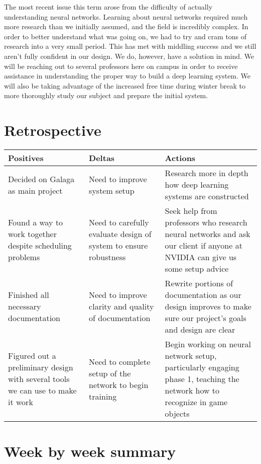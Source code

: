 \documentclass[onecolumn, draftclsnofoot,10pt, compsoc]{IEEEtran}
\begin{document}
\newline\newline
The most recent issue this term arose from the difficulty of actually understanding neural networks.
Learning about neural networks required much more research than we initially assumed, and the field is incredibly complex.
In order to better understand what was going on, we had to try and cram tons of research into a very small period.
This has met with middling success and we still aren't fully confident in our design.
We do, however, have a solution in mind.
We will be reaching out to several professors here on campus in order to receive assistance in understanding the proper way to build a deep learning system.
We will also be taking advantage of the increased free time during winter break to more thoroughly study our subject and prepare the initial system.

\section{Retrospective}

\begin{center}
\begin{tabu} to 0.9\linewidth{ || X[l] | X[l] | X[l] || }
	\hline
	Positives & Deltas & Actions \\
	\hline\hline
	Decided on Galaga as main project & Need to improve system setup & Research more in depth how deep learning systems are constructed \\ \hline
	Found a way to work together despite scheduling problems & Need to carefully evaluate design of system to ensure robustness & Seek help from professors who research neural networks and ask our client if anyone at NVIDIA can give us some setup advice \\ \hline
	Finished all necessary documentation & Need to improve clarity and quality of documentation & Rewrite portions of documentation as our design improves to make sure our project's goals and design are clear \\ \hline
	Figured out a preliminary design with several tools we can use to make it work & Need to complete setup of the network to begin training & Begin working on neural network setup, particularly engaging phase 1, teaching the network how to recognize in game objects \\
	\hline
\end{tabu}
\end{center}

\section{Week by week summary}
\end{document}
